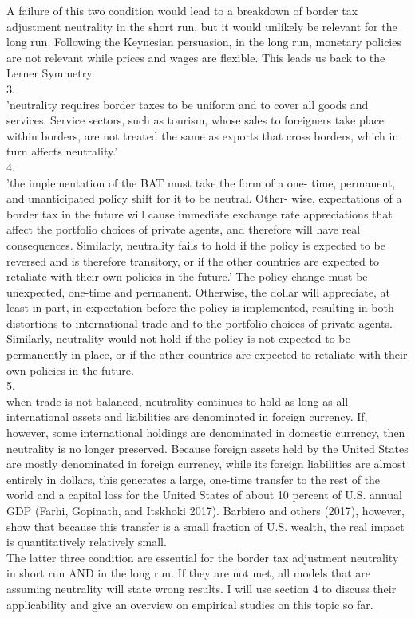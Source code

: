 A failure of this two condition would lead to a breakdown of border tax adjustment neutrality in the short run, but it would unlikely be relevant for the long run. Following the Keynesian persuasion, in the long run, monetary policies are not relevant while prices and wages are flexible. This leads us back to the Lerner Symmetry. \\
3. \\ 'neutrality requires border taxes to be uniform and to cover all goods and services. Service sectors, such as tourism, whose sales to foreigners take place within borders, are not treated the same as exports that cross borders, which in turn affects neutrality.' \\
4. \\ 'the implementation of the BAT must take the form of a one- time, permanent, and unanticipated policy shift for it to be neutral. Other- wise, expectations of a border tax in the future will cause immediate exchange rate appreciations that affect the portfolio choices of private agents, and therefore will have real consequences. Similarly, neutrality fails to hold if the policy is expected to be reversed and is therefore transitory, or if the other countries are expected to retaliate with their own policies in the future.' 
The policy change must be unexpected, one-time and permanent. Otherwise, the dollar will appreciate, at least in part, in expectation before the policy is implemented, resulting in both distortions to international trade and to the portfolio choices of private agents. Similarly, neutrality would not hold if the policy is not expected to be permanently in place, or if the other countries are expected to retaliate with their own policies in the future.\\
5. \\ when trade is not balanced, neutrality continues to hold as long as all international assets and liabilities are denominated in foreign currency. If, however, some international holdings are denominated in domestic currency, then neutrality is no longer preserved. Because foreign assets held by the United States are mostly denominated in foreign currency, while its foreign liabilities are almost entirely in dollars, this generates a large, one-time transfer to the rest of the world and a capital loss for the United States of about 10 percent of U.S. annual GDP (Farhi, Gopinath, and Itskhoki 2017). Barbiero and others (2017), however, show that because this transfer is a small fraction of U.S. wealth, the real impact is quantitatively relatively small. \\
The latter three condition are essential for the border tax adjustment neutrality in short run AND in the long run. If they are not met, all models that are assuming neutrality will state wrong results. I will use section 4 to discuss their applicability and give an overview on empirical studies on this topic so far. \\

